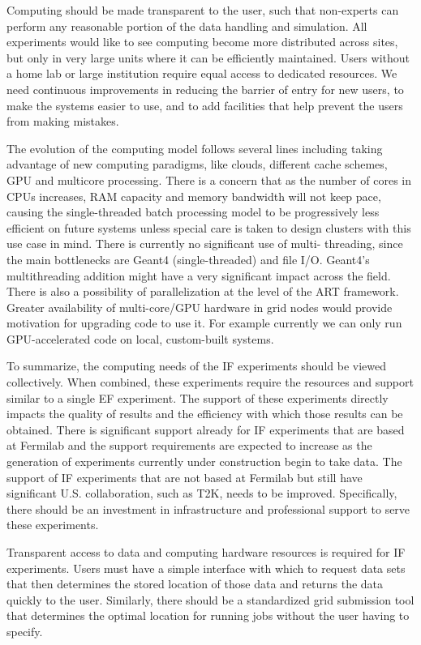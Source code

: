 \begin{itemize}
Computing should be made transparent to the user, such that non-experts can
perform any reasonable portion of the data handling and simulation. All
experiments would like to see computing become more distributed across sites,
but only in very large units where it can be efficiently maintained.  Users
without a home lab or large institution require equal access to dedicated
resources. We need  continuous improvements in reducing the barrier of entry
for new users, to make the systems easier to use, and to add facilities that
help prevent the users from making mistakes.

The evolution of the computing model follows several lines including taking
advantage of new computing paradigms, like clouds, different cache schemes,
GPU and multicore processing. There is a concern that as the number of cores
in CPUs increases, RAM capacity and memory bandwidth will not keep pace,
causing the single-threaded batch processing model to be progressively less
efficient on future systems unless special care is taken to design clusters
with this use case in mind. There is currently no significant use of multi-
threading, since the main bottlenecks are Geant4 (single-threaded) and file
I/O. Geant4's multithreading addition might have a very significant impact
across the field. There is also a possibility of parallelization at the level
of the ART framework. Greater availability of multi-core/GPU hardware in grid
nodes would provide motivation for upgrading code to use it. For example
currently we can only run GPU-accelerated code on local, custom-built systems.

\end{itemize}

To summarize, the computing needs of the IF experiments should be viewed
collectively.  When combined, these experiments require the resources and
support similar to a single EF experiment.  The support of these experiments
directly impacts the quality of results and the efficiency with which those
results can be obtained.  There is significant support already for IF
experiments that are based at Fermilab and the support requirements are
expected to increase as the generation of experiments currently under
construction begin to take data.  The support of IF experiments that are not
based at Fermilab but still have significant U.S. collaboration, such as T2K,
needs to be improved.  Specifically, there should be an investment in
infrastructure and professional support to serve these experiments.

Transparent access to data and computing hardware resources is required for IF
experiments.   Users must have a simple interface with which to request data
sets that then determines the stored location of those data and returns the
data quickly to the user.  Similarly, there should be a standardized grid
submission tool that determines the optimal location for running jobs without
the user having to specify.

